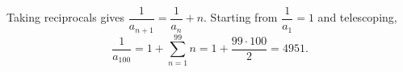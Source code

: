 Taking reciprocals gives $\dfrac{1}{a_{n+1}}=\dfrac{1}{a_n}+n$. Starting from $\dfrac{1}{a_1}=1$ and telescoping,
\[
\dfrac{1}{a_{100}}=1+\sum_{n=1}^{99}n
=1+\dfrac{99\cdot100}{2}=\boxed{4951}.
\]
